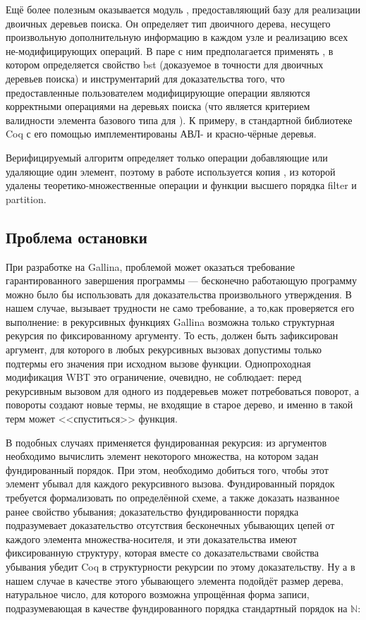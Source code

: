 \documentclass[a4paper,14pt]{extarticle}
\begin{document}
Ещё более полезным оказывается модуль , предоставляющий базу для
реализации двоичных деревьев поиска. Он определяет тип двоичного дерева,
несущего произвольную дополнительную информацию в каждом узле и реализацию всех
не-модифицирующих операций. В паре с ним предполагается применять
, в котором определяется свойство bst (доказуемое в
точности для двоичных деревьев поиска) и инструментарий для доказательства того, что
предоставленные пользователем модифицирующие операции являются корректными
операциями на деревьях поиска (что является критерием валидности элемента
базового типа для ).
К примеру, в стандартной библиотеке Coq
с его помощью имплементированы АВЛ- и красно-чёрные деревья.

Верифицируемый алгоритм определяет только операции
добавляющие или удаляющие один элемент,
поэтому в работе используется копия ,
из которой удалены теоретико-множественные операции и
функции высшего порядка filter и partition.

\subsection{Проблема остановки}

При разработке на Gallina,
проблемой может оказаться требование гарантированного завершения программы ---
бесконечно работающую программу можно было бы использовать
для доказательства произвольного утверждения.
В нашем случае, вызывает трудности не само требование,
а то,как проверяется его выполнение:
в рекурсивных функциях Gallina
возможна только структурная рекурсия
по фиксированному аргументу.
То есть, должен быть зафиксирован аргумент,
для которого в любых рекурсивных вызовах
допустимы только подтермы его значения
при исходном вызове функции.
Однопроходная модификация WBT
это ограничение, очевидно, не соблюдает:
перед рекурсивным вызовом для одного из поддеревьев
может потребоваться поворот,
а повороты создают новые термы, не входящие в старое дерево,
и именно в такой терм может <<спуститься>> функция.

В подобных случаях применяется фундированная рекурсия:
из аргументов необходимо вычислить элемент некоторого множества, на котором
задан фундированный порядок. При этом, необходимо добиться того, чтобы этот
элемент убывал для каждого рекурсивного вызова. Фундированный порядок требуется
формализовать по определённой схеме, а также доказать названное ранее свойство
убывания; доказательство фундированности порядка подразумевает доказательство
отсутствия бесконечных убывающих цепей от каждого элемента множества-носителя, и
эти доказательства имеют фиксированную структуру, которая вместе со
доказательствами свойства убывания убедит Coq в структурности рекурсии по этому
доказательству. Ну а в нашем случае в качестве этого убывающего элемента
подойдёт размер дерева, натуральное число, для которого возможна упрощённая
форма записи, подразумевающая в качестве фундированного порядка стандартный
порядок на \( \mathbb{N} \):
\end{document}
